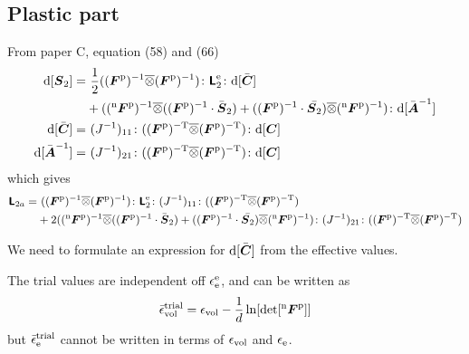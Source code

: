 \documentclass[a4paper,11pt]{article}
\newcommand{\ootimes}{\overline{\otimes}}
\newcommand{\tf}[1]{\text{\boldmath $\sf #1$}}
\newcommand{\ts}[1]{\text{\boldmath $#1$}}
\newcommand{\vol}{{\rm vol}}
\newcommand{\trial}{{\rm trial}}
\newcommand{\rmd}{{\rm d}}
\newcommand{\rme}{{\rm e}}
\newcommand{\rmp}{{\rm p}}
\newcommand{\rmT}{{\rm T}}
\newcommand{\old}{{}^{\rm n}}
\begin{document}
\subsection{Plastic part}
From paper C, equation (58) and (66)
\begin{align*}
	\rmd[\ts S_2] =&\ \frac12((\ts F^\rmp)^{-1}\ootimes(\ts F^\rmp)^{-1})\colon \tf L_2^\rme \colon \rmd[\bar{\ts C}] \\
	&+ ((\old\ts F^\rmp)^{-1}\ootimes((\ts F^\rmp)^{-1}\cdot \bar{\ts S}_2)+((\ts F^\rmp)^{-1}\cdot \bar{\ts S_2})\ootimes (\old \ts F^\rmp)^{-1})\colon\rmd[\bar{\ts A}^{-1}]\\
	\rmd[\bar{\ts C}] =&\ (J^{-1})_{11} \colon ((\ts F^\rmp)^{-\rmT}\ootimes(\ts F^\rmp)^{-\rmT})\colon \rmd[\ts C]\\
	\rmd[\bar{\ts A}^{-1}] =&\ (J^{-1})_{21} \colon ((\ts F^\rmp)^{-\rmT}\ootimes(\ts F^\rmp)^{-\rmT})\colon \rmd[\ts C]
\end{align*}
which gives
\begin{align*}
	\tf L_{2a} =&\ ((\ts F^\rmp)^{-1}\ootimes(\ts F^\rmp)^{-1})\colon \tf L_2^\rme \colon (J^{-1})_{11} \colon ((\ts F^\rmp)^{-\rmT}\ootimes(\ts F^\rmp)^{-\rmT}) \\
	&+ 2((\old\ts F^\rmp)^{-1}\ootimes((\ts F^\rmp)^{-1}\cdot \bar{\ts S}_2)+((\ts F^\rmp)^{-1}\cdot \bar{\ts S_2})\ootimes (\old \ts F^\rmp)^{-1})\colon(J^{-1})_{21} \colon ((\ts F^\rmp)^{-\rmT}\ootimes(\ts F^\rmp)^{-\rmT})
\end{align*}

We need to formulate an expression for $\rmd[\bar{\ts C}]$ from the effective values.

The trial values are independent off $\epsilon_\rme^\rme$, and can be written as
\begin{align*}
	\bar{\epsilon}_\vol^\trial &= \epsilon_\vol - \frac1d\ln[\det[\old\ts F^\rmp]]\\
\end{align*}
but $\bar{\epsilon}_\rme^\trial$ cannot be written in terms of $\epsilon_\vol$ and $\epsilon_\rme$.
\end{document}
